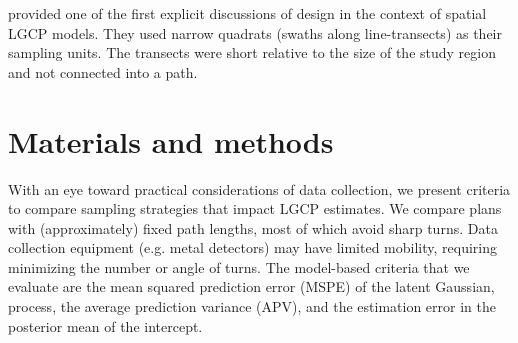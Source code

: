 \documentclass[review]{elsarticle}
\begin{document}
\citet{liuvanhatalo} provided one of the first explicit discussions of design
in the context of spatial LGCP models. They used narrow quadrats (swaths along
line-transects) as their sampling units. The transects were short relative to
the size of the study region and not connected into a path.







\section{Materials and methods}


With an eye toward practical considerations of data collection, we present
criteria to compare sampling strategies that impact LGCP estimates. We compare
plans with (approximately) fixed path lengths, most of which avoid sharp turns.
Data collection equipment (e.g. metal detectors) may have limited mobility,
requiring minimizing the number or angle of turns. The model-based criteria
that we evaluate are the mean squared prediction error (MSPE) of the latent
Gaussian, process, the average prediction variance (APV), and the estimation
error in the posterior mean of the intercept.
\end{document}
